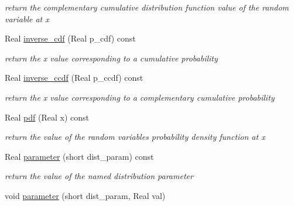 \begin{DoxyCompactItemize}
\begin{DoxyCompactList}\small\item\em return the complementary cumulative distribution function value of the random variable at x \end{DoxyCompactList}\item 
Real \hyperlink{classPecos_1_1NegBinomialRandomVariable_a918a1aac05ca349ea5313eebcba46c3e}{inverse\+\_\+cdf} (Real p\+\_\+cdf) const \label{classPecos_1_1NegBinomialRandomVariable_a918a1aac05ca349ea5313eebcba46c3e}

\begin{DoxyCompactList}\small\item\em return the x value corresponding to a cumulative probability \end{DoxyCompactList}\item 
Real \hyperlink{classPecos_1_1NegBinomialRandomVariable_afda003a1f59ff6930902cd5c8601f49b}{inverse\+\_\+ccdf} (Real p\+\_\+ccdf) const \label{classPecos_1_1NegBinomialRandomVariable_afda003a1f59ff6930902cd5c8601f49b}

\begin{DoxyCompactList}\small\item\em return the x value corresponding to a complementary cumulative probability \end{DoxyCompactList}\item 
Real \hyperlink{classPecos_1_1NegBinomialRandomVariable_a8ec69265f428e17c1707133cb137a819}{pdf} (Real x) const \label{classPecos_1_1NegBinomialRandomVariable_a8ec69265f428e17c1707133cb137a819}

\begin{DoxyCompactList}\small\item\em return the value of the random variable\textquotesingle{}s probability density function at x \end{DoxyCompactList}\item 
Real \hyperlink{classPecos_1_1NegBinomialRandomVariable_aa891dab1ae9a225f493e3a0e5032b778}{parameter} (short dist\+\_\+param) const \label{classPecos_1_1NegBinomialRandomVariable_aa891dab1ae9a225f493e3a0e5032b778}

\begin{DoxyCompactList}\small\item\em return the value of the named distribution parameter \end{DoxyCompactList}\item 
void \hyperlink{classPecos_1_1NegBinomialRandomVariable_ae8e123224f588aee676d5d56d5ca900d}{parameter} (short dist\+\_\+param, Real val)\label{classPecos_1_1NegBinomialRandomVariable_ae8e123224f588aee676d5d56d5ca900d}


\end{DoxyCompactItemize}
